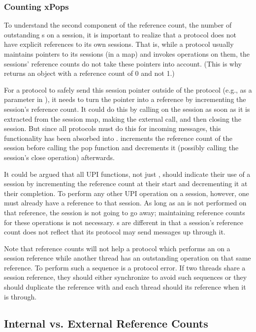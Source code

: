 \subsubsection{ Counting xPops }

To understand the second component of the reference count, the number
of outstanding \xPop{}s on a session, it is important to realize that
a protocol does not have explicit references to its own sessions.
That is, while a protocol usually maintains pointers to its sessions
(in a map) and invokes operations on them, the sessions' reference
counts do not take these pointers into account.  (This is why
\xCreateSessn{} returns an object with a reference count of 0 and not 1.)

For a protocol to safely send this session pointer outside of the
protocol (e.g., as a parameter in \xDemux{}), it needs to turn the
pointer into a reference by incrementing the session's reference
count.  It could do this by calling \xDuplicate{} on the session as
soon as it is extracted from the session map, making the external
call, and then closing the session.  But since all protocols must do
this for incoming messages, this functionality has been absorbed into
\xPop{}. \xPop{} increments the reference count of the session before 
calling the pop function and decrements it (possibly calling the
session's close operation) afterwards.

It could be argued that all UPI functions, not just \xPop{}, should
indicate their use of a session by incrementing the reference count at
their start and decrementing it at their completion.  To perform any
other UPI operation on a session, however, one must already have a
reference to that session.  As long as an \xClose{} is not performed
on that reference, the session is not going to go away; maintaining
reference counts for these operations is not necessary. \xPop{}s are
different in that a session's reference count does not reflect that
its protocol may send messages up through it.

Note that reference counts will not help a protocol which performs an
\xClose{} on a session reference while another thread has an
outstanding operation on that same reference.  To perform such a
sequence is a protocol error.  If two threads share a session
reference, they should either synchronize to avoid such sequences or
they should duplicate the reference with \xDuplicate{} and each thread
should \xClose{} its reference when it is through.


\subsection{Internal vs. External Reference Counts}

